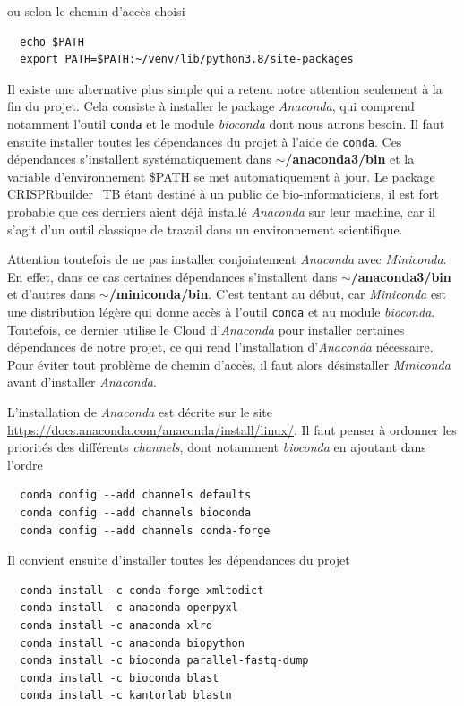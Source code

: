\documentclass[twoside,a4paper,11pt,frenchb,openany]{report}
\begin{document}
ou selon le chemin d'accès choisi

\begin{verbatim}
  echo $PATH
  export PATH=$PATH:~/venv/lib/python3.8/site-packages
\end{verbatim}

Il existe une alternative plus simple qui a retenu notre attention seulement à la fin du projet. Cela consiste à installer le package \textit{Anaconda}, qui comprend notamment l'outil \texttt{conda} et le module \textit{bioconda} dont nous aurons besoin. Il faut ensuite installer toutes les dépendances du projet à l'aide de \texttt{conda}. Ces dépendances s'installent systématiquement dans \textbf{$\sim$/anaconda3/bin} et la variable d'environnement \$PATH se met automatiquement à jour. Le package CRISPRbuilder\_TB étant destiné à un public de bio-informaticiens, il est fort probable que ces derniers aient déjà installé \textit{Anaconda} sur leur machine, car il s'agit d'un outil classique de travail dans un environnement scientifique.  

Attention toutefois de ne pas installer conjointement \textit{Anaconda} avec \textit{Miniconda}. En effet, dans ce cas certaines dépendances s'installent dans \textbf{$\sim$/anaconda3/bin} et d'autres dans \textbf{$\sim$/miniconda/bin}. C'est tentant au début, car \textit{Miniconda} est une distribution légère qui donne accès à l'outil \texttt{conda} et au module \textit{bioconda}. Toutefois, ce dernier utilise le Cloud d'\textit{Anaconda} pour installer certaines dépendances de notre projet, ce qui rend l'installation d'\textit{Anaconda} nécessaire. Pour éviter tout problème de chemin d'accès, il faut alors désinstaller \textit{Miniconda} avant d'installer \textit{Anaconda}. 

L'installation de \textit{Anaconda} est décrite sur le site \url{https://docs.anaconda.com/anaconda/install/linux/}. Il faut penser à ordonner les priorités des différents \textit{channels}, dont notamment \textit{bioconda} en ajoutant dans l'ordre

\begin{verbatim}
  conda config --add channels defaults
  conda config --add channels bioconda
  conda config --add channels conda-forge
\end{verbatim}

 Il convient ensuite d'installer toutes les dépendances du projet
\begin{verbatim}  conda install -c conda-forge xmltodict
  conda install -c anaconda openpyxl
  conda install -c anaconda xlrd
  conda install -c anaconda biopython
  conda install -c bioconda parallel-fastq-dump
  conda install -c bioconda blast
  conda install -c kantorlab blastn\end{verbatim}
\end{document}
